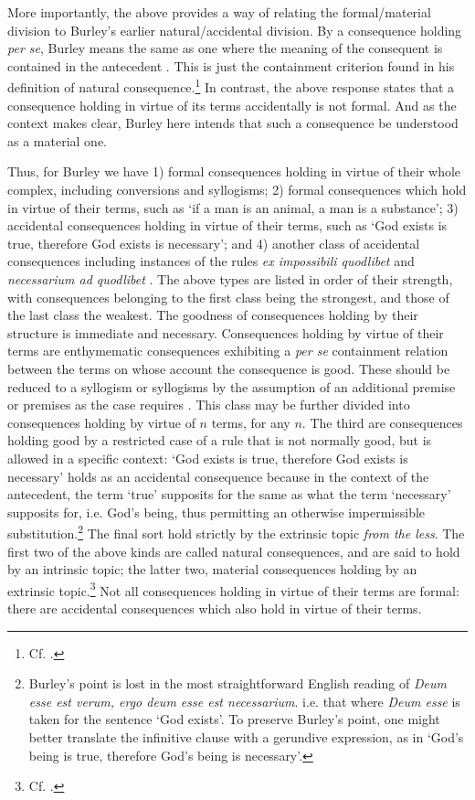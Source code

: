 \documentclass[]{birkjour}
\begin{document}
More importantly, the above provides a way of relating the formal/material division to Burley's earlier natural/accidental division. By a consequence holding \textit{per se}, Burley means the same as one where the meaning of the consequent is contained in the antecedent \autocite[p. 158, par. 160]{Green-Pedersen1980b}. This is just the containment criterion found in his definition of natural consequence.\footnote{Cf. \autocite[I, d. 11, q. 2]{ScotusRepPar}.} In contrast, the above response states that a consequence holding in virtue of its terms accidentally is not formal. And as the context makes clear, Burley here intends that such a consequence be understood as a material one.

Thus, for Burley we have 1) formal consequences holding in virtue of their whole complex, including conversions and syllogisms; 2) formal consequences which hold in virtue of their terms, such as `if a man is an animal, a man is a substance'; 3) accidental consequences holding in virtue of their terms, such as `God exists is true, therefore God exists is necessary'; and 4) another class of accidental consequences including instances of the rules \textit{ex impossibili quodlibet} and \textit{necessarium ad quodlibet} \autocite[pp. 128-129, par. 70]{Green-Pedersen1980b}. The above types are listed in order of their strength, with consequences belonging to the first class being the strongest, and those of the last class the weakest. The goodness of consequences holding by their structure is immediate and necessary. Consequences holding by virtue of their terms are enthymematic consequences exhibiting a \textit{per se} containment relation between the terms on whose account the consequence is good. These should be reduced to a syllogism or syllogisms by the assumption of an additional premise or premises as the case requires \autocite[p. 142, par. 117]{Green-Pedersen1980b}. This class may be further divided into consequences holding by virtue of $n$ terms, for any $n$. The third are consequences holding good by a restricted case of a rule that is not normally good, but is allowed in a specific context: `God exists is true, therefore God exists is necessary' holds as an accidental consequence because in the context of the antecedent, the term `true' supposits for the same as what the term `necessary' supposits for, i.e. God's being, thus permitting an otherwise impermissible substitution.\footnote{Burley's point is lost in the most straightforward English reading of \textit{Deum esse est verum, ergo deum esse est necessarium}. i.e. that where \textit{Deum esse} is taken for the sentence `God exists'. To preserve Burley's point, one might better translate the infinitive clause with a gerundive expression, as in `God's being is true, therefore God's being is necessary'.} The final sort hold strictly by the extrinsic topic \textit{from the less}. The first two of the above kinds are called natural consequences, and are said to hold by an intrinsic topic; the latter two, material consequences holding by an extrinsic topic.\footnote{Cf. \autocite[p. 130]{Martin2004}.} Not all consequences holding in virtue of their terms are formal: there are accidental consequences which also hold in virtue of their terms.
\end{document}
